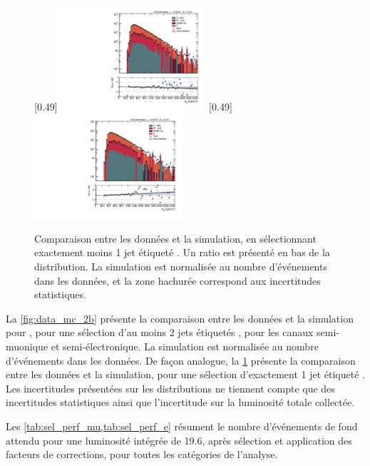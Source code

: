  \begin{figure}[p!] \centering
    [0.49\textwidth]{\includegraphics[width=0.49\textwidth,angle=-90,origin=c]{chapitre7/figs/data_mc/1btag/semimu/hmttSelected_btag_sel.pdf}} \hfill
    [0.49\textwidth]{\includegraphics[width=0.49\textwidth,angle=-90,origin=c]{chapitre7/figs/data_mc/1btag/semie/hmttSelected_btag_sel.pdf}}
    \caption{Comparaison entre les données et la simulation, en sélectionnant exactement moins 1 jet étiqueté \Pbottom{}. Un ratio est présenté en bas de la distribution. La simulation est normalisée au nombre d'événements dans les données, et la zone hachurée correspond aux incertitudes statistiques.}
    \label{fig:data_mc_1b}
\end{figure}

La \cref{fig:data_mc_2b} présente la comparaison entre les données et la simulation pour \mtt, pour une sélection d'au moins 2 jets étiquetés \Pbottom, pour les canaux semi-muonique et semi-électronique. La simulation est normalisée au nombre d'événements dans les données. De façon analogue, la \cref{fig:data_mc_1b} présente la comparaison entre les données et la simulation, pour une sélection d'exactement 1 jet étiqueté \Pbottom. Les incertitudes présentées sur les distributions ne tiennent compte que des incertitudes statistiques ainsi que l'incertitude sur la luminosité totale collectée.

\medskip

Les \cref{tab:sel_perf_mu,tab:sel_perf_e} résument le nombre d'événements de fond attendu pour une luminosité intégrée de \SI{19.6}{\invfb}, après sélection et application des facteurs de corrections, pour toutes les catégories de l'analyse.

